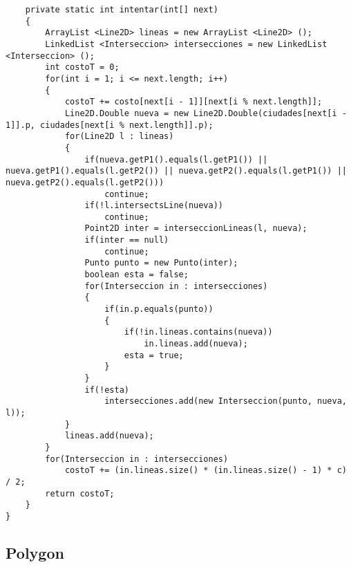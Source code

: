 \documentclass[a4paper, 11pt, oneside]{report}
\begin{document}
\begin{verbatim}
	private static int intentar(int[] next) 
	{
		ArrayList <Line2D> lineas = new ArrayList <Line2D> ();
		LinkedList <Interseccion> intersecciones = new LinkedList <Interseccion> ();
		int costoT = 0;
		for(int i = 1; i <= next.length; i++)
		{
			costoT += costo[next[i - 1]][next[i % next.length]];
			Line2D.Double nueva = new Line2D.Double(ciudades[next[i - 1]].p, ciudades[next[i % next.length]].p);
			for(Line2D l : lineas)
			{
				if(nueva.getP1().equals(l.getP1()) || nueva.getP1().equals(l.getP2()) || nueva.getP2().equals(l.getP1()) || nueva.getP2().equals(l.getP2()))
					continue;
				if(!l.intersectsLine(nueva))
					continue;
				Point2D inter = interseccionLineas(l, nueva);
				if(inter == null)
					continue;
				Punto punto = new Punto(inter);
				boolean esta = false;
				for(Interseccion in : intersecciones)
				{
					if(in.p.equals(punto))
					{
						if(!in.lineas.contains(nueva))
							in.lineas.add(nueva);
						esta = true;
					}
				}
				if(!esta)
					intersecciones.add(new Interseccion(punto, nueva, l));
			}
			lineas.add(nueva);
		}
		for(Interseccion in : intersecciones)
			costoT += (in.lineas.size() * (in.lineas.size() - 1) * c) / 2;
		return costoT;
	}
}

\end{verbatim}

\subsection{Polygon}
\end{document}
